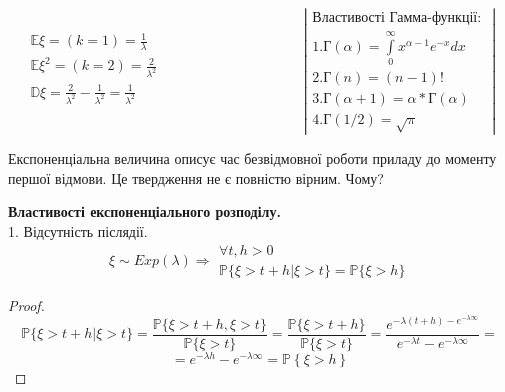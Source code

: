 \documentclass[fontsize=14pt,a4paper]{scrartcl}
\theoremstyle{definition}
\theoremstyle{remark}
\theoremstyle{definition}
\theoremstyle{definition}
\begin{document}
$$
\begin{gathered}
 \mathbb{E} \xi = (k=1) = \frac{1}{\lambda} \\
 \mathbb{E} \xi^2 = (k=2) = \frac{2}{\lambda^2} \\
 \mathbb{D} \xi =  \frac{2}{\lambda^2}  - \frac{1}{\lambda^2} = \frac{1}{\lambda^2}  \\
\end{gathered}
\qquad \qquad\qquad\qquad\qquad
\left|
\begin{gathered}
\textbf{Властивості Гамма-функції: }\\
 1. \text{Г}(\alpha) =  \int\limits_{0}^{ \infty}{ x^{\alpha -1 } e^{-x} dx}\\
 2. \text{Г} (n) = (n-1)!\\
 3. \text{Г} (\alpha+1) = \alpha * \text{Г}(\alpha)\\
 4. \text{Г} (1/2) = \sqrt{\pi}
\end{gathered}
\right|
$$

\begin{center}
	Експоненціальна величина описує час безвідмовної роботи приладу до моменту першої відмови. Це твердження не є повністю вірним. Чому?
\end{center}

\textbf{Властивості експоненціального розподілу.}\\
1. Відсутність післядії. \\
$$ \xi \sim Exp(\lambda) \Rightarrow  \begin{gathered}
 \forall t, h > 0 \\
 \mathbb{P} \{ \xi > t+h \big| \xi >t \}  = \mathbb{P} \{ \xi > h \}
\end{gathered}
$$

\begin{proof}
$$
 \mathbb{P} \{ \xi > t+h \big| \xi >t \}  = \frac{ \mathbb{P} \{ \xi > t+h, \xi > t \}}{ \mathbb{P} \{ \xi > t \}} =
  \frac{ \mathbb{P} \{ \xi > t+h \}}{\mathbb{P} \{ \xi > t \} }=
 \frac{ e^{-\lambda (t+h) - e^{-\lambda \infty}} }{ e^{- \lambda t} - e^ {-\lambda \infty} } =
 $$
$$
= e^{-\lambda h} - e^{-\lambda\infty } = \mathbb{P} \left\lbrace \xi  > h \right\rbrace
$$
\end{proof}
\end{document}
